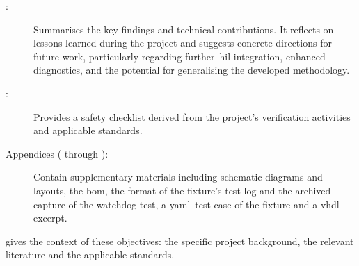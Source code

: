 \begin{description}
	\item[:] Summarises the key findings and technical contributions. It reflects on lessons learned during the project and suggests concrete directions for future work, particularly regarding further~\gls{hil} integration, enhanced diagnostics, and the potential for generalising the developed methodology.
	\item[:] Provides a safety checklist derived from the project's verification activities and applicable standards.
	\item[Appendices ( through ):] Contain supplementary materials including schematic diagrams and layouts, the \gls{bom}, the format of the fixture's test log and the archived capture of the watchdog test, a \gls{yaml}~test case of the fixture and a \gls{vhdl} excerpt.
\end{description}

 gives the context of these objectives: the specific project background, the relevant literature and the applicable standards.

